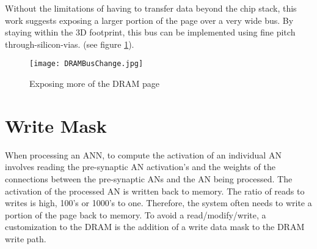 Without the limitations of having to transfer data beyond the chip stack, this work suggests exposing a larger portion of the page over a very wide bus. By staying within the 3D footprint, this bus can be implemented using fine pitch through-silicon-vias.
(see figure \ref{fig:dramBusChange}).

\begin{figure}[!t]
\centering
\captionsetup{justification=centering}
\captionsetup{width=.9\linewidth}
\centerline{
\mbox{\texttt{[image: DRAMBusChange.jpg]}}
}
\caption{Exposing more of the DRAM page}
\label{fig:dramBusChange}
\end{figure}

\section{Write Mask}
\label{sec:Write Mask}
When processing an ANN, to compute the activation of an individual AN involves reading the pre-synaptic AN activation's and the weights of the connections between the pre-synaptic ANs and the AN being processed. The activation of the processed AN is written back to memory. The ratio of reads to writes is high, 100's or 1000's to one. Therefore, the system often needs to write a portion of the page back to memory. To avoid a read/modify/write, a customization to the DRAM is the addition of a write data mask to the DRAM write path.

